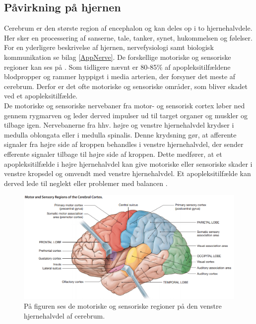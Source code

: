 \subsection{Påvirkning på hjernen}
Cerebrum er den største region af encephalon og kan deles op i to hjernehalvdele. Her sker en processering af sanserne, tale, tanker, synet, hukommelsen og følelser. \cite{Martini2012} For en yderligere beskrivelse af hjernen, nervefysiologi samt biologisk kommunikation se bilag \ref{AppNerve}. De forskellige motoriske og sensoriske regioner kan ses på . Som tidligere nævnt er 80-85\% af apopleksitilfældene blodpropper og rammer hyppigst i media arterien, der forsyner det meste af cerebrum. Derfor er det ofte motoriske og sensoriske områder, som bliver skadet ved et apopleksitilfælde. \cite{Sundhed.dk,Gade2004,Boss2010} \\
De motoriske og sensoriske nervebaner fra motor- og sensorisk cortex løber ned gennem rygmarven og leder derved impulser ud til target organer og muskler og tilbage igen. Nervebanerne fra hhv. højre og venstre hjernehalvdel krydser i medulla oblongata eller i medulla spinalis. Denne krydsning gør, at afferente signaler fra højre side af kroppen behandles i venstre hjernehalvdel, der sender efferente signaler tilbage til højre side af kroppen. \cite{Martini2012,Stanfield2014} Dette medfører, at et apopleksitilfælde i højre hjernehalvdel kan give motoriske eller sensoriske skader i venstre kropsdel og omvendt med venstre hjernehalvdel. Et apopleksitilfælde kan derved lede til neglekt eller problemer med balancen \cite{Sundhedsstyrelsen2009,Nichols1997}.

\begin{figure}[H]
	\centering
	\includegraphics[scale=0.6]{figures/bProblemanalyse/Encephalon.png}
	\caption{På figuren ses de motoriske og sensoriske regioner på den venstre hjernehalvdel af cerebrum. \cite{Martini2012}}
	\label{Enc}
\end{figure}

